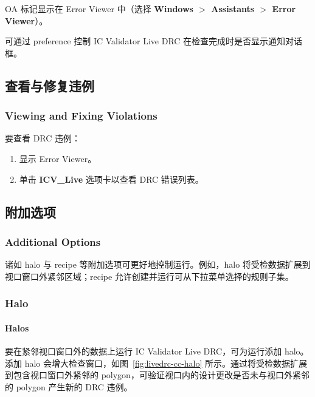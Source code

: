 OA 标记显示在 Error Viewer 中（选择 \textbf{Windows $>$ Assistants $>$ Error Viewer}）。

可通过 preference  控制 IC Validator Live DRC 在检查完成时是否显示通知对话框。


\subsection{查看与修复违例}
\subsubsection*{Viewing and Fixing Violations}

要查看 DRC 违例：
\begin{enumerate}
  \item 显示 Error Viewer。
  \item 单击 \textbf{ICV\_Live} 选项卡以查看 DRC 错误列表。
\end{enumerate}


\subsection{附加选项}
\subsubsection*{Additional Options}

诸如 halo 与 recipe 等附加选项可更好地控制运行。例如，halo 将受检数据扩展到视口窗口外紧邻区域；recipe 允许创建并运行可从下拉菜单选择的规则子集。

\subsubsection{Halo}
\paragraph*{Halos}

要在紧邻视口窗口外的数据上运行 IC Validator Live DRC，可为运行添加 halo。添加 halo 会增大检查窗口，如图~\ref{fig:livedrc-cc-halo} 所示。通过将受检数据扩展到包含视口窗口外紧邻的 polygon，可验证视口内的设计更改是否未与视口外紧邻的 polygon 产生新的 DRC 违例。

